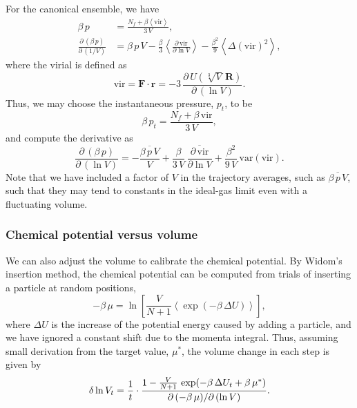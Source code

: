 \documentclass[reprint]{revtex4-1}
\begin{document}
For the canonical ensemble,
we have
%
\begin{align*}
  \beta \, p
  &=
  \frac{
    N_f + \beta \left\langle \mathrm{vir} \right\rangle
  } { 3 \, V }
  ,
  \\
  \frac{ \partial \, (\beta \, p) }
       { \partial \, (1/V) }
  &=
  \beta \, p \, V
  -
  \frac{\beta}{3}
  \left\langle
    \frac{ \partial \, \mathrm{vir} } { \partial \ln V }
  \right\rangle
  -
  \frac{\beta^2}{9}
  \left\langle
  \Delta( \mathrm{vir} )^2
  \right\rangle
  ,
\end{align*}
%
where
the virial is defined as
%
\begin{equation*}
  \mathrm{vir}
  =
  \mathbf F \cdot \mathbf r
  =
  -3 \,
  \frac{ \partial \, U\left( \sqrt[3]{V} \, \mathbf R \right) }
       { \partial \, (\ln V) }
  .
\end{equation*}
%
Thus, we may choose the instantaneous pressure, $p_t$,
to be
%
\begin{equation*}
  \beta \, p_t
  =
  \frac{ N_f + \beta \, \mathrm{vir} }
       { 3 \, V }
  ,
\end{equation*}
%
and compute the derivative as
%
\begin{equation}
  \frac{ \partial \, ( \beta \, p ) }
       { \partial \, ( \ln V ) }
  =
  -\frac{
    \overline{ \beta \, p \, V }
  }{V}
  + \frac{\beta}{3 \, V} \,
      \overline{ \frac{ \partial \, \mathrm{vir} } { \partial \ln V } }
  + \frac{\beta^2}{9 \, V} \,
      \mathrm{var} ( \mathrm{vir} )
  .
  \label{eq:dbpdlnV}
\end{equation}
%
Note that we have included a factor of $V$
in the trajectory averages,
such as $\overline{\beta \, p \, V}$,
such that they
may tend to constants in the ideal-gas limit
even with a fluctuating volume.





\subsubsection{Chemical potential versus volume}

We can also adjust the volume to calibrate the chemical potential.
%
By Widom's insertion method,
the chemical potential can be computed from
trials of inserting a particle at random positions,
%
\begin{equation*}
  -\beta \, \mu
  =
  \ln \left[
  \frac{V}{N+1}
  \left\langle
    \exp(-\beta \, \Delta U)
  \right\rangle
  \right]
  ,
\end{equation*}
%
where $\Delta U$
is the increase of the potential energy
caused by adding a particle,
and we have ignored a constant shift due to the
momenta integral.
%
Thus, assuming small derivation from the target value, $\mu^*$,
the volume change in each step is given by
%
\begin{equation*}
  \delta \ln V_t
  =
  \frac{1}{t} \cdot
  \frac{
    1 - \frac{V}{N+1} \, \exp(-\beta \, \Delta U_t + \beta \, \mu^*)
  }
  {
    \partial \, (-\beta \, \mu) / \partial \, (\ln V)
  }
  .
\end{equation*}
%
\end{document}
